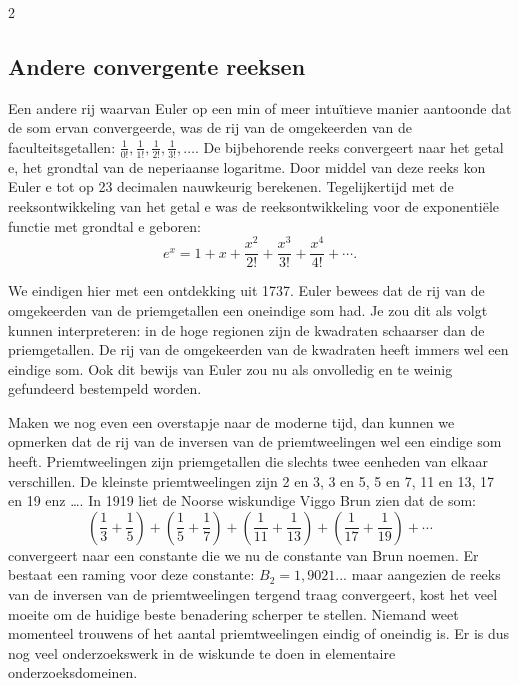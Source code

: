 \begin{multicols}{2}
	\subsection*{Andere convergente reeksen}
	
	Een andere rij waarvan Euler op een min of meer intuïtieve manier aantoonde dat de som ervan convergeerde, was de rij van de omgekeerden van de faculteitsgetallen: $\frac{1}{0!}, \frac{1}{1!},\frac{1}{2!},\frac{1}{3!},\dots$. De bijbehorende reeks convergeert naar het getal e, het grondtal van de neperiaanse logaritme. Door middel van deze reeks kon Euler e tot op 23 decimalen nauwkeurig berekenen. Tegelijkertijd met de reeksontwikkeling van het getal e was de reeksontwikkeling voor de exponentiële functie met grondtal e geboren:
	\[e^x=1+x+\frac{x^2}{2!}+\frac{x^3}{3!}+\frac{x^4}{4!}+\cdots.\]
	
	We eindigen hier met een ontdekking uit 1737. Euler bewees dat de rij van de omgekeerden van de priemgetallen een oneindige som had. Je zou dit als volgt kunnen interpreteren: in de hoge regionen zijn de kwadraten schaarser dan de priemgetallen. De rij van de omgekeerden van de kwadraten heeft immers wel een eindige som. Ook dit bewijs van Euler zou nu als onvolledig en te weinig gefundeerd bestempeld worden.
	
	Maken we nog even een overstapje naar de moderne tijd, dan kunnen we opmerken dat de rij van de inversen van de priemtweelingen wel een eindige som heeft. Priemtweelingen zijn priemgetallen die slechts twee eenheden van elkaar verschillen. De kleinste priemtweelingen zijn 2 en 3, 3 en 5, 5 en 7, 11 en 13, 17 en 19 enz \dots. In 1919 liet de Noorse wiskundige Viggo Brun zien dat de  som:
	\[\left(\frac{1}{3}+\frac{1}{5}\right)+\left(\frac{1}{5}+\frac{1}{7}\right)+\left(\frac{1}{11}+\frac{1}{13}\right)+\left(\frac{1}{17}+\frac{1}{19}\right)+\cdots\]
	convergeert naar een constante die we nu de constante van Brun noemen. Er bestaat een raming voor deze constante: $B_2=1,9021...$ maar aangezien de reeks van de inversen van de priemtweelingen tergend traag convergeert, kost het veel moeite om de huidige beste benadering scherper te stellen. Niemand weet momenteel trouwens of het aantal priemtweelingen eindig of oneindig is. Er is dus nog veel onderzoekswerk in de wiskunde te doen in elementaire onderzoeksdomeinen.   
	
\end{multicols}

\stopcontents[inhoudloep]		%


